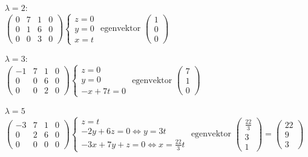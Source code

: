 \begin{enumerate}
    \item[$\lambda=2$:]~\\
        $\begin{pmatrix}
            0&7&1&0\\
            0&1&6&0\\
            0&0&3&0
        \end{pmatrix}
        \begin{cases}
            z=0\\
            y=0\\
            x=t
        \end{cases}
        \text{ egenvektor }
        \begin{pmatrix}
            1\\0\\0
        \end{pmatrix}$
    \item[$\lambda=3$:]~\\
        $\begin{pmatrix}
            -1&7&1&0\\
            0&0&6&0\\
            0&0&2&0
        \end{pmatrix}
        \begin{cases}
            z=0\\
            y=0\\
            -x+7t=0
        \end{cases}
        \text{ egenvektor }
        \begin{pmatrix}
            7\\1\\0
        \end{pmatrix}$
    \item[$\lambda=5$] ~\\
        $\begin{pmatrix}
            -3&7&1&0\\
            0&2&6&0\\
            0&0&0&0
        \end{pmatrix}
        \begin{cases}
            z=t\\
            -2y+6z=0\Leftrightarrow y=3t\\
            -3x+7y+z=0\Leftrightarrow x=\frac{22}{3}t
        \end{cases}
        \text{ egenvektor }
        \begin{pmatrix}
            \frac{22}{3}\\3\\1
        \end{pmatrix}=
        \begin{pmatrix}
            22\\
            9\\
            3
        \end{pmatrix}$
\end{enumerate}
